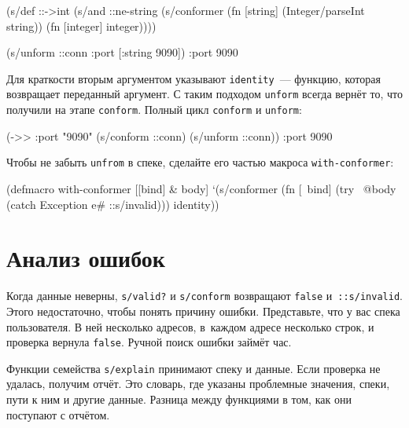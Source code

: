 \begin{english}
  \begin{clojure}
(s/def ::->int
  (s/and
   ::ne-string
   (s/conformer
    (fn [string]
      (Integer/parseInt string))
    (fn [integer]
      integer))))

(s/unform ::conn {:port [:string 9090]})
{:port 9090}
  \end{clojure}
\end{english}


Для краткости вторым аргументом указывают \verb|identity|~--- функцию, которая
возвращает переданный аргумент. С таким подходом \verb|unform| всегда
вернёт то, что получили на этапе \verb|conform|. Полный цикл
\verb|conform| и \verb|unform|:

\begin{english}
  \begin{clojure}
(->> {:port "9090"}
     (s/conform ::conn)
     (s/unform ::conn))
{:port 9090}
  \end{clojure}
\end{english}

Чтобы не забыть \verb|unfrom| в спеке, сделайте его частью макроса
\verb|with-conformer|:

\begin{english}
  \begin{clojure}
(defmacro with-conformer
  [[bind] & body]
  `(s/conformer
    (fn [~bind]
      (try
        ~@body
        (catch Exception e#
          ::s/invalid)))
    identity))
  \end{clojure}
\end{english}

\section{Анализ ошибок}


\label{spec-explain}

Когда данные неверны, \verb|s/valid?| и \verb|s/conform| возвращают \verb|false|
и~\verb|::s/invalid|. Этого недостаточно, чтобы понять причину
ошибки. Представьте, что у вас спека пользователя. В ней несколько адресов,
в~каждом адресе несколько строк, и проверка вернула \verb|false|. Ручной поиск
ошибки займёт час.

Функции семейства \verb|s/explain| принимают спеку и данные. Если проверка не
удалась, получим отчёт. Это словарь, где указаны проблемные значения, спеки,
пути к ним и другие данные. Разница между функциями в том, как они поступают с
отчётом.

